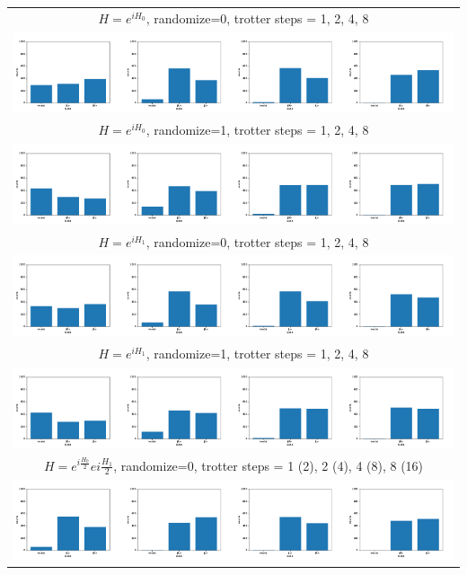 \documentclass[]{standalone}
\begin{document}
\begin{tabular}{c}
$ H = e^{iH_{0}} $, randomize=0, trotter steps = 1, 2, 4, 8 \\
\includegraphics[width=1.0\textwidth]{col_d_0_r_0_rc_0_steps_1_2_4_8.pdf} \\
$ H = e^{iH_{0}} $, randomize=1, trotter steps = 1, 2, 4, 8 \\
\includegraphics[width=1.0\textwidth]{col_d_0_r_1_rc_0_steps_1_2_4_8.pdf} \\
$ H = e^{iH_{1}} $, randomize=0, trotter steps = 1, 2, 4, 8 \\
\includegraphics[width=1.0\textwidth]{col_d_1_r_0_rc_0_steps_1_2_4_8.pdf} \\
$ H = e^{iH_{1}} $, randomize=1, trotter steps = 1, 2, 4, 8 \\
\includegraphics[width=1.0\textwidth]{col_d_1_r_1_rc_0_steps_1_2_4_8.pdf} \\
$ H = e^{i\frac{H_0}{2}}e{i\frac{H_1}{2}} $, randomize=0, trotter steps = 1 (2), 2 (4), 4 (8), 8 (16) \\
\includegraphics[width=1.0\textwidth]{col_d_2_r_0_rc_0_steps_1_2_4_8.pdf} \\

\end{tabular}
\end{document}
